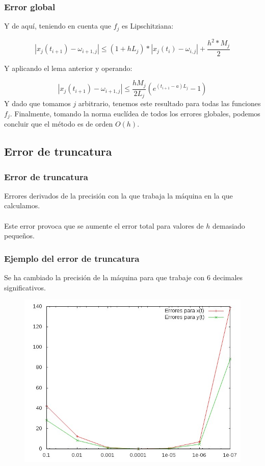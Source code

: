\documentclass{beamer}
\begin{document}
\begin{frame}
	\frametitle{Error global}
	Y de aquí, teniendo en cuenta que $f_j$ es Lipschitziana:
	
	$$ | x_j(t_{i+1}) - \omega_{i+1,j} | \leq (1+hL_j)*| x_j(t_i) - \omega_{i,j} | + \frac{h^2*M_j}{2} $$
	
	Y aplicando el lema anterior y operando:
	
	$$ | x_j(t_{i+1}) - \omega_{i+1, j} | \leq \frac{hM_j}{2L_j}(e^{(t_{i+1}-a)L_j} - 1) $$
	Y dado que tomamos $j$ arbitrario, tenemos este resultado para todas las funciones $f_j$. Finalmente, tomando la norma euclídea de todos los errores globales, podemos concluir que el método es de orden $O(h)$.
\end{frame}

\subsection{Error de truncatura}
\begin{frame}
	\frametitle{Error de truncatura}

	Errores derivados de la precisión con la que trabaja la máquina en la que calculamos.\\~\\

	Este error provoca que se aumente el error total para valores de $h$ demasiado pequeños.

\end{frame}

\begin{frame}
	\frametitle{Ejemplo del error de truncatura}

		Se ha cambiado la precisión de la máquina para que trabaje con 6 decimales significativos.
		\begin{figure}
		\centering
		\includegraphics[scale=0.4]{img/graph_error_comb}
		\end{figure}

\end{frame}
\end{document}
